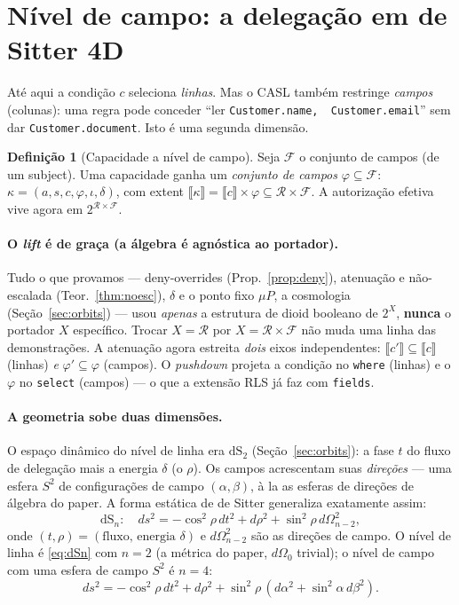 \documentclass[11pt,a4paper]{article}
\theoremstyle{definition}
\newtheorem{definition}[theorem]{Definição}
\newcommand{\R}{\mathcal{R}}
\newcommand{\ext}[1]{\llbracket #1 \rrbracket}
\newcommand{\dep}{\delta}
\newcommand{\F}{\mathcal{F}}
\newcommand{\dS}{\mathrm{dS}}
\begin{document}
\section{Nível de campo: a delegação em de Sitter 4D}\label{sec:field}

Até aqui a condição $c$ seleciona \emph{linhas}. Mas o CASL também restringe
\emph{campos} (colunas): uma regra pode conceder ``ler \texttt{Customer.name,
\,Customer.email}'' sem dar \texttt{Customer.document}. Isto é uma segunda
dimensão.

\begin{definition}[Capacidade a nível de campo]
Seja $\F$ o conjunto de campos (de um subject). Uma capacidade ganha um
\emph{conjunto de campos} $\varphi\subseteq\F$:
$\kappa=(a,s,c,\varphi,\iota,\dep)$, com extent
$\ext{\kappa}=\ext{c}\times\varphi\subseteq\R\times\F$. A autorização efetiva
vive agora em $2^{\R\times\F}$.
\end{definition}

\paragraph{O \emph{lift} é de graça (a álgebra é agnóstica ao portador).} Tudo
o que provamos --- deny-overrides (Prop.~\ref{prop:deny}), atenuação e
não-escalada (Teor.~\ref{thm:noesc}), $\dep$ e o ponto fixo $\mu P$, a
cosmologia (Seção~\ref{sec:orbits}) --- usou \emph{apenas} a estrutura de
dioid booleano de $2^{X}$, \textbf{nunca} o portador $X$ específico. Trocar
$X=\R$ por $X=\R\times\F$ não muda uma linha das demonstrações. A atenuação
agora estreita \emph{dois} eixos independentes: $\ext{c'}\subseteq\ext{c}$
(linhas) \emph{e} $\varphi'\subseteq\varphi$ (campos). O \emph{pushdown}
projeta a condição no \texttt{where} (linhas) e o $\varphi$ no \texttt{select}
(campos) --- o que a extensão RLS já faz com \texttt{fields}.

\paragraph{A geometria sobe duas dimensões.} O espaço dinâmico do nível de
linha era $\dS_2$ (Seção~\ref{sec:orbits}): a fase $t$ do fluxo de delegação
mais a energia $\dep$ (o $\rho$). Os campos acrescentam suas \emph{direções}
--- uma esfera $S^2$ de configurações de campo $(\alpha,\beta)$, à la as
esferas de direções de álgebra do paper. A forma estática de de Sitter
generaliza exatamente assim:
\begin{equation}
  \dS_n:\quad ds^2=-\cos^2\!\rho\,dt^2+d\rho^2+\sin^2\!\rho\,d\Omega^2_{n-2},
  \label{eq:dSn}
\end{equation}
onde $(t,\rho)=(\text{fluxo, energia }\dep)$ e $d\Omega^2_{n-2}$ são as
direções de campo. O nível de linha é \eqref{eq:dSn} com $n=2$ (a métrica do
paper, $d\Omega_0$ trivial); o nível de campo com uma esfera de campo $S^2$ é
$n=4$:
\[
  ds^2=-\cos^2\!\rho\,dt^2+d\rho^2+\sin^2\!\rho\,(d\alpha^2+\sin^2\!\alpha\,d\beta^2).
\]
\end{document}
